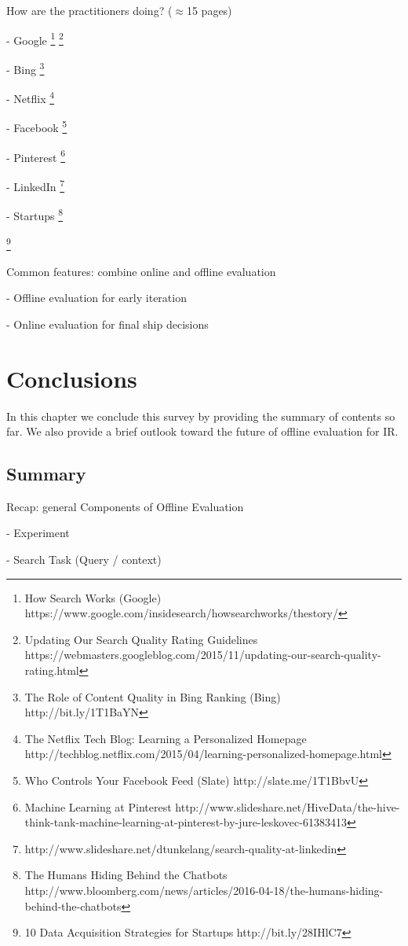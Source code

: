 \documentclass[openany]{now} %
\newcommand{\newpar}{\bigskip\noindent}
\begin{document}
How are the practitioners doing? (\ensuremath{\approx}15 pages)

- Google \footnote{How Search Works (Google) https://www.google.com/insidesearch/howsearchworks/thestory/} \footnote{Updating Our Search Quality Rating Guidelines
	 https://webmasters.googleblog.com/2015/11/updating-our-search-quality-rating.html}

- Bing \footnote{The Role of Content Quality in Bing Ranking (Bing)
	 http://bit.ly/1T1BaYN}

- Netflix \cite{Gomez-Uribe2015}  \footnote{The Netflix Tech Blog: Learning a Personalized Homepage
	http://techblog.netflix.com/2015/04/learning-personalized-homepage.html}

- Facebook \footnote{Who Controls Your Facebook Feed (Slate) http://slate.me/1T1BbvU}

- Pinterest \footnote{Machine Learning at Pinterest http://www.slideshare.net/HiveData/the-hive-think-tank-machine-learning-at-pinterest-by-jure-leskovec-61383413}

- LinkedIn \footnote{http://www.slideshare.net/dtunkelang/search-quality-at-linkedin}

- Startups \footnote{The Humans Hiding Behind the Chatbots http://www.bloomberg.com/news/articles/2016-04-18/the-humans-hiding-behind-the-chatbots}

\footnote{10 Data Acquisition Strategies for Startups http://bit.ly/28IHlC7}

\newpar
Common features: combine online and offline evaluation

- Offline evaluation for early iteration

- Online evaluation for final ship decisions

\chapter{Conclusions}

In this chapter we conclude this survey by providing the summary of contents so far. 
We also provide a brief outlook toward the future of offline evaluation for IR.

\section{Summary}

Recap: general Components of Offline Evaluation

-	Experiment

-	Search Task (Query / context)
\end{document}
